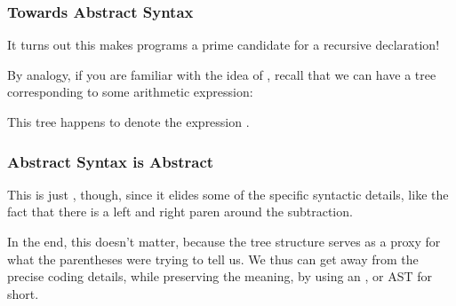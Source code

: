 \documentclass[aspectratio=169]{beamer}
\begin{document}
\begin{frame}[fragile]
  \frametitle{Towards Abstract Syntax}

  It turns out this makes programs a prime candidate for a recursive 
  declaration!

  \vspace{\fill}

  By analogy, if you are familiar with the idea of , recall that we can
  have a tree corresponding to some arithmetic expression:

  \begin{center}
  \end{center}

  \vspace{\fill}

  This tree happens to denote the expression .
\end{frame}

\begin{frame}[fragile]
  \frametitle{Abstract Syntax is Abstract}

  This is just , though, since it elides some of the
  specific syntactic details, like the fact that there is a left and right paren
  around the subtraction.

  \vspace{\fill}

  In the end, this doesn't matter, because the tree structure serves as a
  proxy for what the parentheses were trying to tell us. We thus can get away
  from the precise coding details, while preserving the meaning, by using an
  , or AST for short.
\end{frame}
\end{document}
